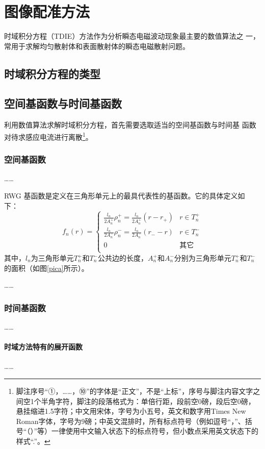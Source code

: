 
\chapter{图像配准方法}
时域积分方程（TDIE）方法作为分析瞬态电磁波动现象最主要的数值算法之
一，常用于求解均匀散射体和表面散射体的瞬态电磁散射问题。
\section{时域积分方程的类型}
\section{空间基函数与时间基函数}
利用数值算法求解时域积分方程，首先需要选取适当的空间基函数与时间基
函数对待求感应电流进行离散\footnote{脚注序号“①，……，⑩”的字体是“正文”，不是“上标”，序号与脚注内容文字之间空1个半角字符，脚注的段落格式为：单倍行距，段前空0磅，段后空0磅，悬挂缩进1.5字符；中文用宋体，字号为小五号，英文和数字用Times New Roman字体，字号为9磅；中英文混排时，所有标点符号（例如逗号“，”、括号“（）”等）一律使用中文输入状态下的标点符号，但小数点采用英文状态下的样式“.”。}。
\subsection{空间基函数}
……

RWG 基函数是定义在三角形单元上的最具代表性的基函数。它的具体定义如
下：
\begin{equation}
f_n(r)=
\begin{cases}
\frac{l_n}{2A_n^+}\rho_n^+=\frac{l_n}{2A_n^+}(r-r_+)&r\in T_n^+\\
\frac{l_n}{2A_n^-}\rho_n^-=\frac{l_n}{2A_n^-}(r_--r)&r\in T_n^-\\
0&\text{其它}\\
\end{cases}
\end{equation}
其中，$l_n$为三角形单元$T_n^+$和$T_n^-$公共边的长度，$A_n^+$和$A_n^-$分别为三角形单元$T_n^+$和$T_n^-$的面积（如图\ref{pica}所示）。

……

\subsection{时间基函数}
……
\subsubsection{时域方法特有的展开函数}
……

